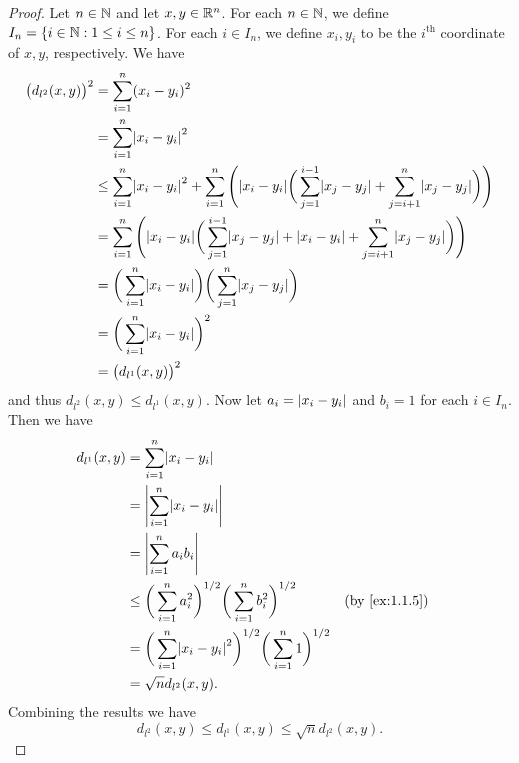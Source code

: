 \begin{proof}
  Let \(n \in \mathbb{N}\) and let \(x, y \in \mathbb{R}^n\).
  For each \(n \in \mathbb{N}\), we define \(I_n = \{i \in \mathbb{N} : 1 \leq i \leq n\}\).
  For each \(i \in I_n\), we define \(x_i, y_i\) to be the \(i^{\text{th}}\) coordinate of \(x, y\), respectively.
  We have
  \begin{align*}
    \big(d_{l^2}(x, y)\big)^2 & = \sum_{i = 1}^n (x_i - y_i)^2                                                                                                                                           \\
                              & = \sum_{i = 1}^n \abs{x_i - y_i}^2                                                                                                                                       \\
                              & \leq \sum_{i = 1}^n \abs{x_i - y_i}^2 + \sum_{i = 1}^n \Bigg(\abs{x_i - y_i} \bigg(\sum_{j = 1}^{i - 1} \abs{x_j - y_j} + \sum_{j = i + 1}^n \abs{x_j - y_j}\bigg)\Bigg) \\
                              & = \sum_{i = 1}^n \Bigg(\abs{x_i - y_i} \bigg(\sum_{j = 1}^{i - 1} \abs{x_j - y_j} + \abs{x_i - y_i} + \sum_{j = i + 1}^n \abs{x_j - y_j}\bigg)\Bigg)                     \\
                              & = \bigg(\sum_{i = 1}^n \abs{x_i - y_i}\bigg) \bigg(\sum_{j = 1}^n \abs{x_j - y_j}\bigg)                                                                                  \\
                              & = \bigg(\sum_{i = 1}^n \abs{x_i - y_i}\bigg)^2                                                                                                                           \\
                              & = \big(d_{l^1}(x, y)\big)^2
  \end{align*}
  and thus \(d_{l^2}(x, y) \leq d_{l^1}(x, y)\).
  Now let \(a_i = \left\lvert x_i - y_i\right\rvert\) and \(b_i = 1\) for each \(i \in I_n\).
  Then we have
  \begin{align*}
    d_{l^1}(x, y) & = \sum_{i = 1}^n \abs{x_i - y_i}                                                                               \\
                  & = \abs{\sum_{i = 1}^n \abs{x_i - y_i}}                                                                         \\
                  & = \abs{\sum_{i = 1}^n a_i b_i}                                                                                 \\
                  & \leq \bigg(\sum_{i = 1}^n a_i^2\bigg)^{1 / 2} \bigg(\sum_{i = 1}^n b_i^2\bigg)^{1 / 2}      &  & \by{ex:1.1.5} \\
                  & = \bigg(\sum_{i = 1}^n \abs{x_i - y_i}^2\bigg)^{1 / 2} \bigg(\sum_{i = 1}^n 1\bigg)^{1 / 2}                    \\
                  & = \sqrt{n} d_{l^2}(x, y).
  \end{align*}
  Combining the results we have
  \[
    d_{l^2}(x, y) \leq d_{l^1}(x, y) \leq \sqrt{n} d_{l^2}(x, y).
  \]
\end{proof}

